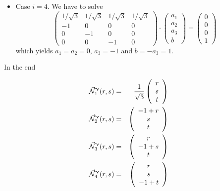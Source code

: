 \begin{itemize}
\item Case $i=4$. We have to solve
\[
\left(\begin{array}{cccc}
1/\sqrt3 & 1/\sqrt3 & 1/\sqrt3 & 1/\sqrt3 \\
-1 & 0 & 0 & 0 \\
0 & -1 & 0 & 0 \\
0 & 0 & -1 & 0
\end{array}\right)
\cdot
\left(\begin{array}{c}
a_1 \\ a_2 \\ a_3 \\ b
\end{array}\right)
=
\left(\begin{array}{c}
0 \\ 0 \\ 0 \\ 1
\end{array}\right)
\]
which yields $a_1=a_2=0$, $a_3=-1$ and $b=-a_3=1$.

\end{itemize}

In the end


\begin{mdframed}[backgroundcolor=blue!5]
\begin{eqnarray}
\vec{{\mathcal{N}}}^\upnu_1 (r,s) &=& \frac{1}{\sqrt3}
\left(\begin{array}{c} r \\s \\ t \end{array}\right) \nonumber\\
\vec{{\mathcal{N}}}^\upnu_2 (r,s) &=& 
\left(\begin{array}{c} -1+r \\ s \\t\end{array}\right) \nonumber\\
\vec{{\mathcal{N}}}^\upnu_3 (r,s) &=& 
\left(\begin{array}{c} r \\ -1+s \\t \end{array}\right) \nonumber\\
\vec{{\mathcal{N}}}^\upnu_4 (r,s) &=& 
\left(\begin{array}{c} r\\s\\-1+t \end{array}\right)
\end{eqnarray}
\end{mdframed}


